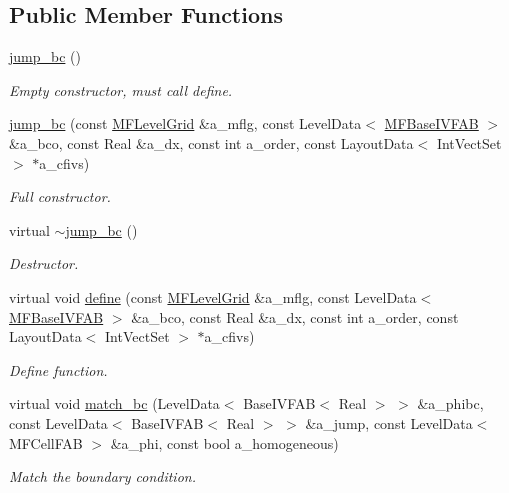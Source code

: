 \subsection*{Public Member Functions}
\begin{DoxyCompactItemize}
\item 
\hyperlink{classjump__bc_acf85be4103f4360d6dd84989fdf30bb6}{jump\+\_\+bc} ()
\begin{DoxyCompactList}\small\item\em Empty constructor, must call define. \end{DoxyCompactList}\item 
\hyperlink{classjump__bc_a65bd92fc79782adb32aad1d714e39922}{jump\+\_\+bc} (const \hyperlink{classMFLevelGrid}{M\+F\+Level\+Grid} \&a\+\_\+mflg, const Level\+Data$<$ \hyperlink{classMFBaseIVFAB}{M\+F\+Base\+I\+V\+F\+AB} $>$ \&a\+\_\+bco, const Real \&a\+\_\+dx, const int a\+\_\+order, const Layout\+Data$<$ Int\+Vect\+Set $>$ $\ast$a\+\_\+cfivs)
\begin{DoxyCompactList}\small\item\em Full constructor. \end{DoxyCompactList}\item 
virtual \hyperlink{classjump__bc_ae83a3dbdbfb798d56032d6c41ffd80d7}{$\sim$jump\+\_\+bc} ()
\begin{DoxyCompactList}\small\item\em Destructor. \end{DoxyCompactList}\item 
virtual void \hyperlink{classjump__bc_a29b8337c6c081f89d9aaffc8bb95b7a7}{define} (const \hyperlink{classMFLevelGrid}{M\+F\+Level\+Grid} \&a\+\_\+mflg, const Level\+Data$<$ \hyperlink{classMFBaseIVFAB}{M\+F\+Base\+I\+V\+F\+AB} $>$ \&a\+\_\+bco, const Real \&a\+\_\+dx, const int a\+\_\+order, const Layout\+Data$<$ Int\+Vect\+Set $>$ $\ast$a\+\_\+cfivs)
\begin{DoxyCompactList}\small\item\em Define function. \end{DoxyCompactList}\item 
virtual void \hyperlink{classjump__bc_af26b94f50874f565a87f01513930a99a}{match\+\_\+bc} (Level\+Data$<$ Base\+I\+V\+F\+AB$<$ Real $>$ $>$ \&a\+\_\+phibc, const Level\+Data$<$ Base\+I\+V\+F\+AB$<$ Real $>$ $>$ \&a\+\_\+jump, const Level\+Data$<$ M\+F\+Cell\+F\+AB $>$ \&a\+\_\+phi, const bool a\+\_\+homogeneous)
\begin{DoxyCompactList}\small\item\em Match the boundary condition. \end{DoxyCompactList}\item 

\end{DoxyCompactItemize}
